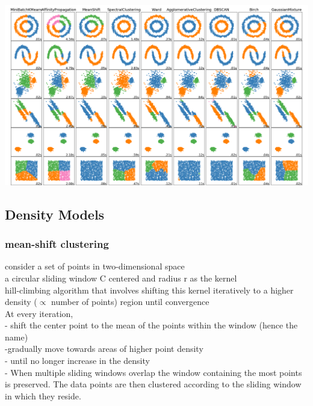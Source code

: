 \documentclass{beamer}
\begin{document}
\begin{frame}%
	\includegraphics[scale=0.15]{clustering}

\end{frame}




\subsection{Density Models}
\begin{frame}\frametitle{mean-shift clustering}

consider a set of points in two-dimensional space\\
a circular sliding window C centered and radius r as the kernel\\
hill-climbing algorithm that involves shifting this kernel iteratively to a higher density ($\propto$ number of points)  region until convergence\\
At every iteration,\\
- shift the center point to the mean of the points within the window (hence the name)\\
-gradually move towards areas of higher point density\\
- until no longer increase in the density\\
- When multiple sliding windows overlap the window containing the most points is preserved. The data points are then clustered according to the sliding window in which they reside.


\end{frame}
\end{document}
